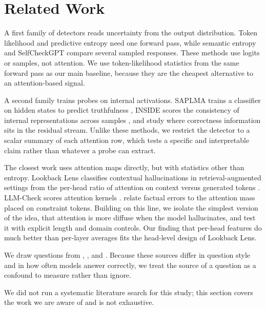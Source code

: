 \section{Related Work}
\label{sec:related}

A first family of detectors reads uncertainty from the output distribution.
Token likelihood and predictive entropy need one forward pass, while semantic entropy \citep{kuhn2023semantic} and SelfCheckGPT \citep{manakul2023selfcheckgpt} compare several sampled responses.
These methods use logits or samples, not attention.
We use token-likelihood statistics from the same forward pass as our main baseline, because they are the cheapest alternative to an attention-based signal.

A second family trains probes on internal activations.
SAPLMA trains a classifier on hidden states to predict truthfulness \citep{azaria2023internal}, INSIDE scores the consistency of internal representations across samples \citep{chen2024inside}, and \citet{orgad2025llms} study where correctness information sits in the residual stream.
Unlike these methods, we restrict the detector to a scalar summary of each attention row, which tests a specific and interpretable claim rather than whatever a probe can extract.

The closest work uses attention maps directly, but with statistics other than entropy.
Lookback Lens classifies contextual hallucinations in retrieval-augmented settings from the per-head ratio of attention on context versus generated tokens \citep{chuang2024lookback}.
LLM-Check scores attention kernels \citep{sriramanan2024llmcheck}.
\citet{yuksekgonul2024attention} relate factual errors to the attention mass placed on constraint tokens.
Building on this line, we isolate the simplest version of the idea, that attention is more diffuse when the model hallucinates, and test it with explicit length and domain controls.
Our finding that per-head features do much better than per-layer averages fits the head-level design of Lookback Lens.

We draw questions from \popqa \citep{mallen2023popqa}, \sciq \citep{welbl2017sciq}, and \triviaqa \citep{joshi2017triviaqa}.
Because these sources differ in question style and in how often models answer correctly, we treat the source of a question as a confound to measure rather than ignore.

We did not run a systematic literature search for this study; this section covers the work we are aware of and is not exhaustive.
